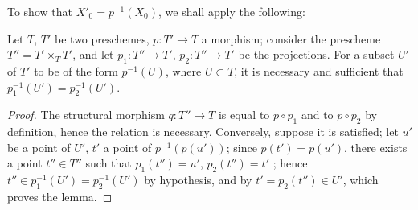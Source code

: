 To show that $X'_0=p^{-1}(X_0)$, we shall apply the following:

\begin{lemma}[4.5.19.1]
\label{IV.4.5.19.1}
Let $T$, $T'$ be two preschemes, $p:T'\to T$ a morphism; consider the prescheme $T''=T'\times_T T'$, and let $p_1:T''\to T'$, $p_2:T''\to T'$ be the projections.
For a subset $U'$ of $T'$ to be of the form $p^{-1}(U)$, where $U\subset T$, it is necessary and sufficient that $p_1^{-1}(U')=p_2^{-1}(U')$.
\end{lemma}

\begin{proof}
The structural morphism $q:T''\to T$ is equal to $p\circ p_1$ and to $p\circ p_2$ by definition, hence the relation is necessary.
Conversely, suppose it is satisfied; let $u'$ be a point of $U'$, $t'$ a point of $p^{-1}(p(u'))$; since $p(t')=p(u')$, there exists a point $t''\in T''$ such that $p_1(t'')=u'$, $p_2(t'')=t'$ ; hence $t''\in p_1^{-1}(U')=p_2^{-1}(U')$ by hypothesis, and by $t'=p_2(t'')\in U'$, which proves the lemma.
\end{proof}

